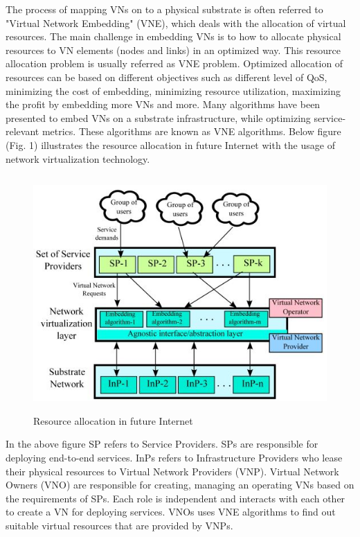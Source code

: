 \documentclass[article,dr=phil,type=msc ,colorback,accentcolor=tud4b]{tudthesis}
\begin{document}
 The process of mapping VNs on to a physical substrate is often referred to "Virtual Network Embedding" (VNE), which deals with the allocation of virtual resources. The main challenge in embedding VNs is to how to allocate physical resources to VN elements (nodes and links) in an optimized way. This resource allocation problem is usually referred as VNE problem. Optimized allocation of resources can be based on different objectives such as different level of QoS, minimizing the cost of embedding, minimizing resource utilization, maximizing the profit by embedding more VNs and more. Many algorithms have been presented to embed VNs on a substrate infrastructure, while optimizing service-relevant metrics. These algorithms are known as VNE algorithms. Below figure (Fig. 1) illustrates the resource allocation in future Internet with the usage of network virtualization technology.\newline
 \begin{figure}[h]
 	\centering
 	\includegraphics[width=14cm, height=9cm]{vne.jpg}
 	\caption{Resource allocation in future Internet}
 	\label{fig: Network Virtualization}
 \end{figure}
 
 In the above figure SP refers to Service Providers. SPs are responsible for deploying end-to-end services. InPs refers to Infrastructure Providers who lease their physical resources to Virtual Network Providers (VNP). Virtual Network Owners (VNO) are responsible for creating, managing an operating VNs based on the requirements of SPs. Each role is independent and interacts with each other to create a VN for deploying services. VNOs uses VNE algorithms to find out suitable virtual resources that are provided by VNPs.\newline
 
\end{document}
